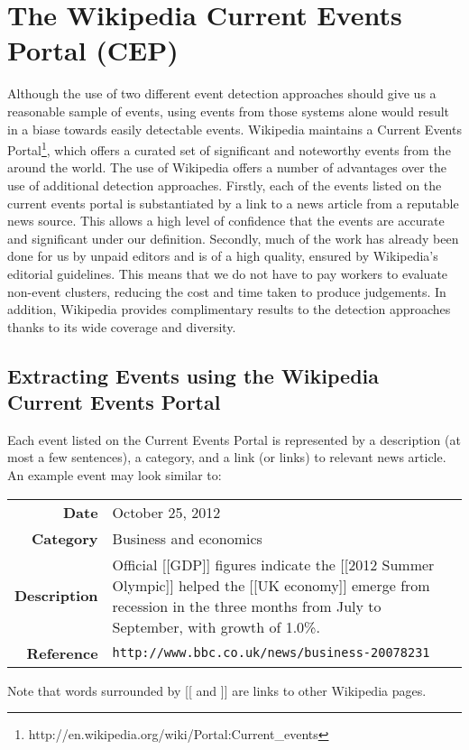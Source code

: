 \section{The Wikipedia Current Events Portal (CEP)}
Although the use of two different event detection approaches should give us a reasonable sample of events, using events from those systems alone would result in a biase towards easily detectable events.
Wikipedia maintains a Current Events Portal\footnote{http://en.wikipedia.org/wiki/Portal:Current\_events}, which offers a curated set of significant and noteworthy events from the around the world.
The use of Wikipedia offers a number of advantages over the use of additional detection approaches.
Firstly, each of the events listed on the current events portal is substantiated by a link to a news article from a reputable news source.
This allows a high level of confidence that the events are accurate and significant under our definition.
Secondly, much of the work has already been done for us by unpaid editors and is of a high quality, ensured by Wikipedia's editorial guidelines.
This means that we do not have to pay workers to evaluate non-event clusters, reducing the cost and time taken to produce judgements.
In addition, Wikipedia provides complimentary results to the detection approaches thanks to its wide coverage and diversity.

\subsection{Extracting Events using the Wikipedia Current Events Portal}
Each event listed on the Current Events Portal is represented by a description (at most a few sentences), a category, and a link (or links) to relevant news article.
An example event may look similar to:

{
\begin{tabulary}{\textwidth}{r L}
\textbf{Date} & October 25, 2012\\
\textbf{Category} & Business and economics\\
\textbf{Description} & Official [[GDP]] figures indicate the [[2012 Summer Olympic]] helped the [[UK economy]] emerge from recession in the three months from July to September, with growth of 1.0\%. \\
\textbf{Reference} & \texttt{http://www.bbc.co.uk/news/business-20078231}\\
\end{tabulary}
}

Note that words surrounded by [[ and ]] are links to other Wikipedia pages.

